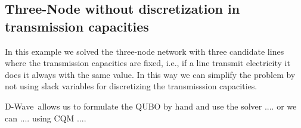 \subsection{Three-Node without discretization in transmission capacities}
In this example we solved the three-node network with three candidate lines where the transmission capacities are fixed, i.e., if a line transmit electricity it does it always with the same value. In this way we can simplify the problem by not using slack variables for discretizing the transmisssion capacities.


D-Wave\,\cite{D-WaveDocumentation} allows us to formulate the QUBO by hand and use the  solver .... or we can .... using CQM ....

